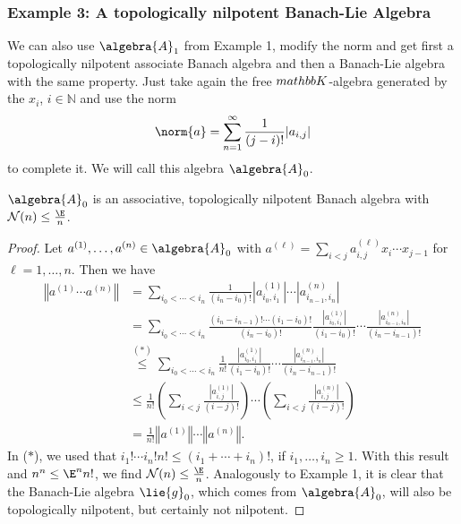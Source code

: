\documentclass[
11pt,                          %
english                        %
]{article}
\begin{document}
\subsubsection{Example 3: A topologically nilpotent Banach-Lie Algebra}
We can also use $\algebra{A}_1$ from Example 1, modify the norm and get first a 
topologically nilpotent associate Banach algebra and then a Banach-Lie algebra with 
the same property. Just take again the free $\\mathbb{K}$-algebra generated by the 
$x_i$, $i \in \mathbb{N}$ and use the norm
\begin{equation}
	\norm{a}
	=
	\sum\limits_{n = 1}^\infty
	\frac{1}{(j - i)!}|a_{i,j}|
\end{equation}
to complete it. We will call this algebra $\algebra{A}_0$.
\begin{lemma}
	$\algebra{A}_0$ is an associative, topologically nilpotent 
	Banach algebra with $\mathcal{N}(n) \leq \frac{\E}{n}$.
\end{lemma}
\begin{proof}
	Let $a^{(1)}, \ldots, a^{(n)} \in \algebra{A}_0$ with $a^{(\ell)} = \sum_{i < j}
	a_{i,j}^{(\ell)} x_i \cdots x_{j-1}$ for $\ell = 1, \ldots, n$. Then we have
	\begin{align*}
		\left\Vert
			a^{(1)} \cdots a^{(n)}
		\right\Vert
		&=
		\sum\limits_{i_0 < \cdots < i_n}
		\frac{1}{(i_n - i_0)!}
		|a_{i_0, i_1}^{(1)}| \cdots |a_{i_{n-1}, i_n}^{(n)}|
		\\
		&=
		\sum\limits_{i_0 < \cdots < i_n}
		\frac{(i_n - i_{n-1})! \cdots (i_1 - i_0)!}{(i_n - i_0)!}
		\frac{|a_{i_0, i_1}^{(1)}|}{(i_1 - i_0)!} 
		\cdots 
		\frac{|a_{i_{n-1}, i_n}^{(n)}|}{(i_n - i_{n-1})!}
		\\
		& \stackrel{(*)}{\leq}
		\sum\limits_{i_0 < \cdots < i_n}
		\frac{1}{n!}
		\frac{|a_{i_0, i_1}^{(1)}|}{(i_1 - i_0)!} 
		\cdots 
		\frac{|a_{i_{n-1}, i_n}^{(n)}|}{(i_n - i_{n-1})!}
		\\
		& \leq
		\frac{1}{n!}
		\left(
			\sum\limits_{i < j}
			\frac{|a_{i, j}^{(1)}|}{(i - j)!} 
		\right)
		\cdots 
		\left(
			\sum\limits_{i < j}
			\frac{|a_{i, j}^{(n)}|}{(i - j)!} 
		\right)
		\\
		& =
		\frac{1}{n!}
		\left\Vert a^{(1)} \right\Vert
		\cdots
		\left\Vert a^{(n)} \right\Vert.
	\end{align*}
	In ($*$), we used that $i_1! \cdots i_n! n! \leq (i_1 + \cdots + i_n)!$,
	if $i_1, \ldots, i_n \geq 1$. With this result and $n^n \leq \E^n n!$,
	we find $\mathcal{N}(n) \leq \frac{\E}{n}$. Analogously to Example 1, it is 
	clear that the Banach-Lie algebra $\lie{g}_0$, which comes from $\algebra{A}_0$, 
	will also be topologically nilpotent, but certainly not nilpotent.
\end{proof}
\end{document}
